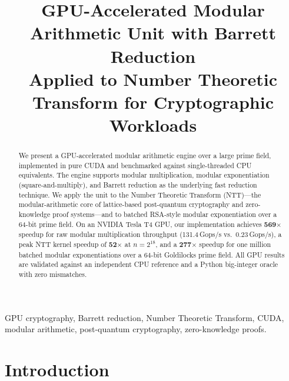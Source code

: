 \documentclass[conference]{IEEEtran}
\begin{document}
\title{GPU-Accelerated Modular Arithmetic Unit with Barrett Reduction\\
{\footnotesize Applied to Number Theoretic Transform for Cryptographic Workloads}}

\author{
}

\maketitle

\begin{abstract}
We present a GPU-accelerated modular arithmetic engine over a large prime field, implemented in
pure CUDA and benchmarked against single-threaded CPU equivalents. The engine supports modular
multiplication, modular exponentiation (square-and-multiply), and Barrett reduction as the
underlying fast reduction technique. We apply the unit to the Number Theoretic Transform (NTT)—the
modular-arithmetic core of lattice-based post-quantum cryptography and zero-knowledge proof
systems—and to batched RSA-style modular exponentiation over a 64-bit prime field. On an NVIDIA
Tesla T4 GPU, our implementation achieves \textbf{569$\times$} speedup for raw modular
multiplication throughput (131.4\,Gops/s vs.\ 0.23\,Gops/s), a peak NTT kernel speedup of
\textbf{52$\times$} at $n{=}2^{18}$, and a \textbf{277$\times$} speedup for one million batched
modular exponentiations over a 64-bit Goldilocks prime field. All GPU results are validated against
an independent CPU reference and a Python big-integer oracle with zero mismatches.
\end{abstract}

\begin{IEEEkeywords}
GPU cryptography, Barrett reduction, Number Theoretic Transform, CUDA, modular arithmetic,
post-quantum cryptography, zero-knowledge proofs.
\end{IEEEkeywords}

\section{Introduction}
\label{sec:intro}
\end{document}
